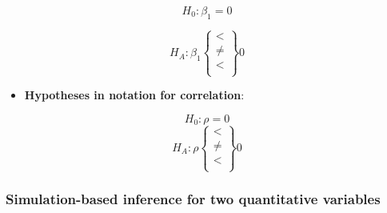 \documentclass[
]{report}
\providecommand{\tightlist}{%
  \setlength{\itemsep}{0pt}\setlength{\parskip}{0pt}}
\begin{document}
\[H_0: \beta_1 = 0\]

\[H_A: \beta_1 \left\{
\begin{array}{ll}
< \\
\ne \\
< \\
\end{array}
\right\}
0\]

\begin{itemize}
\tightlist
\item
  \textbf{Hypotheses in notation for correlation}:
\end{itemize}

\[H_0: \rho = 0\]
\[H_A: \rho \left\{
\begin{array}{ll}
< \\
\ne \\
< \\
\end{array}
\right\}
0\]

\subsubsection*{Simulation-based inference for two quantitative variables}\label{simulation-based-inference-for-two-quantitative-variables}
\end{document}
